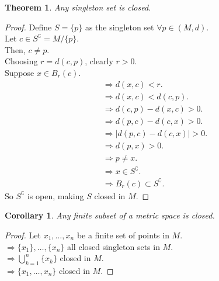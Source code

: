 \documentclass{article}
\newtheorem{theorem}{Theorem}[section]
\newtheorem{corollary}{Corollary}[theorem]
\begin{document}
			\begin{theorem}
				Any singleton set is closed.
			\end{theorem}
			\begin{proof} 
				Define $S = \{p\}$ as the singleton set $\forall p \in (M, d)$. \\
				Let $c \in S^\complement = M / \{p\}$. \\
				Then, $c \neq p$. \\
				Choosing $r = d(c, p)$, clearly $r > 0$. \\
				Suppose $x \in B_{r}(c)$.
				\begin{align*}
					&\Rightarrow d(x, c) < r. \\
					&\Rightarrow d(x, c) < d(c, p). \\
					&\Rightarrow d(c, p) - d(x, c) > 0. \\
					&\Rightarrow d(p, c) - d(c, x) > 0. \\
					&\Rightarrow | d(p, c) - d(c, x) | > 0. \\
					&\Rightarrow d(p, x) > 0. \\
					&\Rightarrow p \neq x. \\
					&\Rightarrow x \in S^\complement. \\
					&\Rightarrow B_{r}(c) \subset S^\complement.
				\end{align*}
				So $S^\complement$ is open, making $S$ closed in $M$.
			\end{proof}

			\begin{corollary}
				Any finite subset of a metric space is closed.
			\end{corollary}
			\begin{proof}
				Let $x_1, \ldots, x_n$ be a finite set of points in $M$. \\
				$\Rightarrow \{x_1\}, \ldots, \{x_n\}$ all closed singleton sets in $M$. \\
				$\Rightarrow \bigcup_{k=1}^{n} \{x_k\}$ closed in $M$. \\
				$\Rightarrow \{ x_1, \ldots, x_n \}$ closed in $M$.
			\end{proof}
\end{document}
